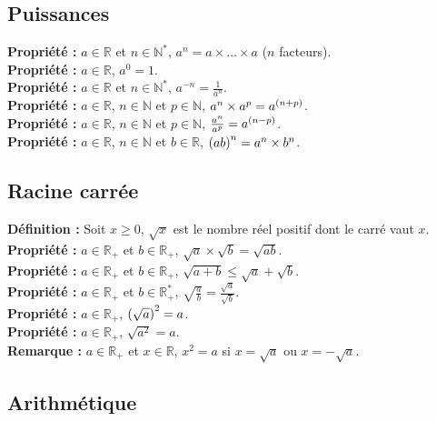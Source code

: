 \documentclass[a4paper,titlepage]{article}
\let\oldleft\left
\renewcommand{\left}{\mathopen{}\mathclose\bgroup\oldleft}
\let\oldright\right
\renewcommand{\right}{\aftergroup\egroup\oldright}
\begin{document}
    \subsection{Puissances}
        \textbf{Propriété :} $a\in\mathbb{R}$ et $n\in\mathbb{N}^{*}$, $a^{n}=a\times\ldots\times a$ ($n$ facteurs).
        \\
        \textbf{Propriété :} $a\in\mathbb{R}$, $a^{0}=1$.
        \\
        \textbf{Propriété :} $a\in\mathbb{R}$ et $n\in\mathbb{N}^{*}$, $a^{-n}=\frac{1}{a^{n}}$.
        \\
        \textbf{Propriété :} $a\in\mathbb{R}$, $n\in\mathbb{N}$ et $p\in\mathbb{N}$, $a^{n}\times a^{p}=a^{\left(n+p\right)}$.
        \\
        \textbf{Propriété :} $a\in\mathbb{R}$, $n\in\mathbb{N}$ et $p\in\mathbb{N}$, $\frac{a^{n}}{a^{p}}=a^{\left(n-p\right)}$.
        \\
        \textbf{Propriété :} $a\in\mathbb{R}$, $n\in\mathbb{N}$ et $b\in\mathbb{R}$, $\left(ab\right)^{n}=a^{n}\times b^{n}$.
    \subsection{Racine carrée}
        \textbf{Définition :} Soit $x\geqslant0$, $\sqrt{x}$ est le nombre réel positif dont le carré vaut $x$.
        \\
        \textbf{Propriété :} $a\in\mathbb{R}_{+}$ et $b\in\mathbb{R}_{+}$, $\sqrt{a}\times\sqrt{b}=\sqrt{ab}$.
        \\
        \textbf{Propriété :} $a\in\mathbb{R}_{+}$ et $b\in\mathbb{R}_{+}$, $\sqrt{a+b}\leqslant\sqrt{a}+\sqrt{b}$.
        \\
        \textbf{Propriété :} $a\in\mathbb{R}_{+}$ et $b\in\mathbb{R}^{*}_{+}$, $\sqrt{\frac{a}{b}}=\frac{\sqrt{a}}{\sqrt{b}}$.
        \\
        \textbf{Propriété :} $a\in\mathbb{R}_{+}$, $\left(\sqrt{a}\right)^\mathrm{2}=a$.
        \\
        \textbf{Propriété :} $a\in\mathbb{R}_{+}$, $\sqrt{a^{2}}=a$.
        \\
        \textbf{Remarque :} $a\in\mathbb{R}_\mathrm{+}$ et $x\in\mathbb{R}$, $x^{2}=a$ si $x=\sqrt{a}$ ou $x=-\sqrt{a}$.
    \subsection{Arithmétique}
\end{document}
